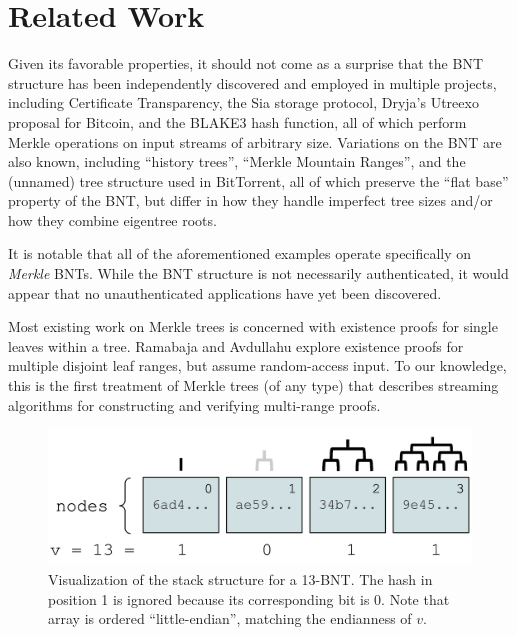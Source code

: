 \documentclass[twocolumn]{article}
\begin{document}
\section{Related Work}

Given its favorable properties, it should not come as a surprise that the BNT structure has been independently discovered and employed in multiple projects, including Certificate Transparency\cite{RFC6962}, the Sia storage protocol\cite{Sia}, Dryja's Utreexo\cite{Utreexo} proposal for Bitcoin, and the BLAKE3 hash function\cite{BLAKE}, all of which perform Merkle operations on input streams of arbitrary size. Variations on the BNT are also known, including ``history trees''\cite{CrosbyWallach}, ``Merkle Mountain Ranges''\cite{Todd}, and the (unnamed) tree structure used in BitTorrent, all of which preserve the ``flat base'' property of the BNT, but differ in how they handle imperfect tree sizes and/or how they combine eigentree roots.

It is notable that all of the aforementioned examples operate specifically on \textit{Merkle} BNTs. While the BNT structure is not necessarily authenticated, it would appear that no unauthenticated applications have yet been discovered.

Most existing work on Merkle trees is concerned with existence proofs for single leaves within a tree. Ramabaja and Avdullahu\cite{CMM} explore existence proofs for multiple disjoint leaf ranges, but assume random-access input. To our knowledge, this is the first treatment of Merkle trees (of any type) that describes streaming algorithms for constructing and verifying multi-range proofs.

\begin{figure}[t]
\includegraphics[scale=0.3]{stack}
\centering
\caption{Visualization of the stack structure for a 13-BNT. The hash in position 1 is ignored because its corresponding bit is 0. Note that array is ordered ``little-endian'', matching the endianness of $v$.}
\label{img-stack}
\end{figure}

\end{document}
